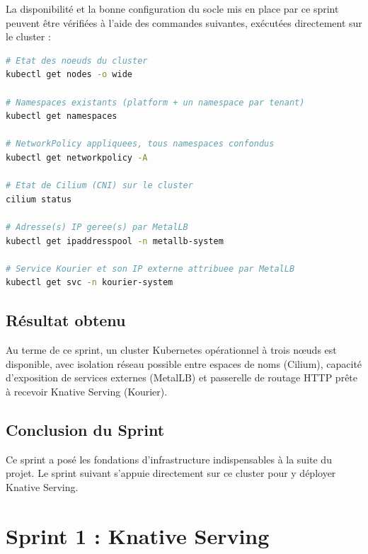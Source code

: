 La disponibilité et la bonne configuration du socle mis en place par ce sprint peuvent être vérifiées à l'aide des commandes suivantes, exécutées directement sur le cluster :

\begin{lstlisting}[language=bash, caption={Commandes de validation du socle Kubernetes (Sprint 0)}, label={lst:validation-sprint0}]
# Etat des noeuds du cluster
kubectl get nodes -o wide

# Namespaces existants (platform + un namespace par tenant)
kubectl get namespaces

# NetworkPolicy appliquees, tous namespaces confondus
kubectl get networkpolicy -A

# Etat de Cilium (CNI) sur le cluster
cilium status

# Adresse(s) IP geree(s) par MetalLB
kubectl get ipaddresspool -n metallb-system

# Service Kourier et son IP externe attribuee par MetalLB
kubectl get svc -n kourier-system
\end{lstlisting}


\subsection{Résultat obtenu}

Au terme de ce sprint, un cluster Kubernetes opérationnel à trois nœuds est disponible, avec isolation réseau possible entre espaces de noms (Cilium), capacité d'exposition de services externes (MetalLB) et passerelle de routage HTTP prête à recevoir Knative Serving (Kourier).

\subsection{Conclusion du Sprint}

Ce sprint a posé les fondations d'infrastructure indispensables à la suite du projet. Le sprint suivant s'appuie directement sur ce cluster pour y déployer Knative Serving.


\section{Sprint 1 : Knative Serving}

